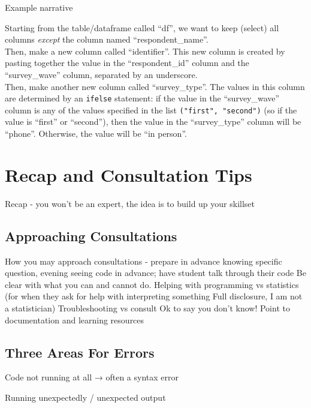 \documentclass[
]{book}
\begin{document}
Example narrative

Starting from the table/dataframe called ``df'', we want to keep (select) all columns \emph{except} the column named ``respondent\_name''.\\

Then, make a new column called ``identifier''. This new column is created by pasting together the value in the ``respondent\_id'' column and the ``survey\_wave'' column, separated by an underscore.\\

Then, make another new column called ``survey\_type''. The values in this column are determined by an \texttt{ifelse} statement: if the value in the ``survey\_wave'' column is any of the values specified in the list \texttt{("first",\ "second")} (so if the value is ``first'' or ``second''), then the value in the ``survey\_type'' column will be ``phone''. Otherwise, the value will be ``in person''.\\

\hfill\break

\chapter{Recap and Consultation Tips}\label{recap-and-consultation-tips}

Recap - you won't be an expert, the idea is to build up your skillset

\section{Approaching Consultations}\label{approaching-consultations}

How you may approach consultations - prepare in advance knowing specific question, evening seeing code in advance; have student talk through their code
Be clear with what you can and cannot do.
Helping with programming vs statistics (for when they ask for help with interpreting something Full disclosure, I am not a statistician)
Troubleshooting vs consult
Ok to say you don't know! Point to documentation and learning resources

\section{Three Areas For Errors}\label{three-areas-for-errors}

Code not running at all → often a syntax error

Running unexpectedly / unexpected output
\end{document}
